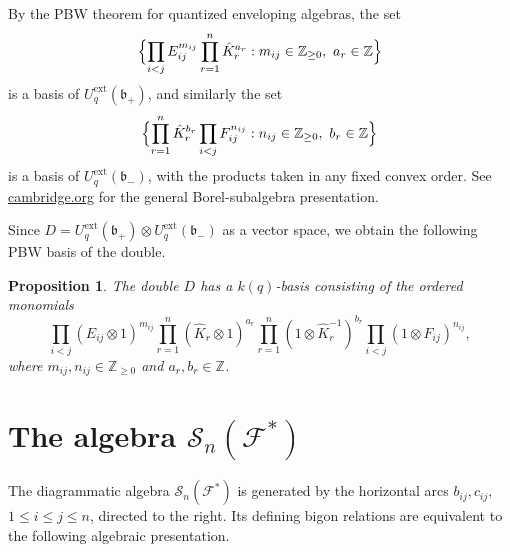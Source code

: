 \documentclass[11pt]{article}
\newtheorem{proposition}{Proposition}
\theoremstyle{definition}
\newcommand{\Uq}{U_q^{\mathrm{ext}}}
\newcommand{\fb}{\mathfrak{b}}
\newcommand{\F}{\mathcal{F}}
\newcommand{\cS}{\mathcal{S}}
\newcommand{\KK}{\hat K}
\begin{document}
By the PBW theorem for quantized enveloping algebras, the set
\[
\Bigl\{\prod_{i<j}E_{ij}^{m_{ij}}\prod_{r=1}^n \KK_r^{a_r}
: m_{ij}\in\mathbb Z_{\ge0},\ a_r\in\mathbb Z\Bigr\}
\]
is a basis of $\Uq(\fb_+)$, and similarly the set
\[
\Bigl\{\prod_{r=1}^n \KK_r^{b_r}\prod_{i<j}F_{ij}^{n_{ij}}
: n_{ij}\in\mathbb Z_{\ge0},\ b_r\in\mathbb Z\Bigr\}
\]
is a basis of $\Uq(\fb_-)$, with the products taken in any fixed convex order.
See
\href{https://www.cambridge.org/core/services/aop-cambridge-core/content/view/886B0B4D8E3D242A51A0380A486351EA/S0013091504000689a.pdf/presentation-by-borel-subalgebras-and-chevalley-generators-for-quantum-enveloping-algebras.pdf}{cambridge.org}
for the general Borel-subalgebra presentation.

Since $D=\Uq(\fb_+)\otimes\Uq(\fb_-)$ as a vector space, we obtain the following
PBW basis of the double.

\begin{proposition}
\label{prop:pbw}
The double $D$ has a $k(q)$-basis consisting of the ordered monomials
\begin{equation}
\label{eq:pbw-double}
\prod_{i<j}(E_{ij}\otimes 1)^{m_{ij}}
\prod_{r=1}^n(\KK_r\otimes 1)^{a_r}
\prod_{r=1}^n(1\otimes \KK_r^{-1})^{b_r}
\prod_{i<j}(1\otimes F_{ij})^{n_{ij}},
\end{equation}
where $m_{ij},n_{ij}\in\mathbb Z_{\ge0}$ and $a_r,b_r\in\mathbb Z$.
\end{proposition}

\section{The algebra $\cS_n(\F^*)$}

The diagrammatic algebra $\cS_n(\F^*)$ is generated by the horizontal arcs
$b_{ij},c_{ij}$, $1\le i\le j\le n$, directed to the right. Its defining bigon
relations are equivalent to the following algebraic presentation.
\end{document}
